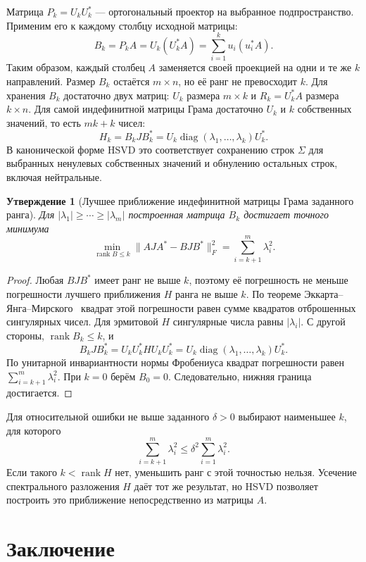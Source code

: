 \documentclass[a4paper,12pt]{article}
\DeclareMathOperator{\rank}{rank}
\DeclareMathOperator{\diag}{diag}
\theoremstyle{csstyle}
\newtheorem{proposition}[theorem]{Утверждение}
\begin{document}
Матрица $P_k=U_kU_k^*$ --- ортогональный проектор на выбранное
подпространство. Применим его к каждому столбцу исходной матрицы:
\[
B_k=P_kA=U_k(U_k^*A)=\sum_{i=1}^{k}u_i(u_i^*A).
\]
Таким образом, каждый столбец $A$ заменяется своей проекцией
на одни и те же $k$ направлений. Размер $B_k$ остаётся $m\times n$,
но её ранг не превосходит $k$.
Для хранения $B_k$ достаточно двух матриц: $U_k$ размера $m\times k$
и $R_k=U_k^*A$ размера $k\times n$.
Для самой индефинитной матрицы Грама достаточно $U_k$ и $k$ собственных значений,
то есть $mk+k$ чисел:
\[
H_k=B_kJB_k^*=U_k\diag(\lambda_1,\ldots,\lambda_k)U_k^*.
\]
В канонической форме HSVD это соответствует сохранению
строк $\Sigma$ для выбранных ненулевых собственных значений
и обнулению остальных строк, включая нейтральные.

\begin{proposition}[Лучшее приближение индефинитной матрицы Грама заданного ранга]
\label{prop:app-compression}
Для $|\lambda_1|\ge\cdots\ge|\lambda_m|$ построенная матрица $B_k$
достигает точного минимума
\[
\min_{\rank B\le k}\|AJA^*-BJB^*\|_F^2
=\sum_{i=k+1}^{m}\lambda_i^2.
\]
\end{proposition}
\begin{proof}
Любая $BJB^*$ имеет ранг не выше $k$, поэтому её погрешность не меньше
погрешности лучшего приближения $H$ ранга не выше $k$.
По теореме Эккарта--Янга--Мирского~\cite{Golub} квадрат этой погрешности
равен сумме квадратов отброшенных сингулярных чисел.
Для эрмитовой $H$ сингулярные числа равны $|\lambda_i|$.
С другой стороны, $\rank B_k\le k$, и
\[
B_kJB_k^*=U_kU_k^*HU_kU_k^*
=U_k\diag(\lambda_1,\ldots,\lambda_k)U_k^*.
\]
По унитарной инвариантности нормы Фробениуса квадрат погрешности равен
$\sum_{i=k+1}^{m}\lambda_i^2$.
При $k=0$ берём $B_0=0$. Следовательно, нижняя граница достигается.
\end{proof}

Для относительной ошибки не выше заданного $\delta>0$ выбирают
наименьшее $k$, для которого
\[
\sum_{i=k+1}^{m}\lambda_i^2\le\delta^2\sum_{i=1}^{m}\lambda_i^2.
\]
Если такого $k<\rank H$ нет, уменьшить ранг с этой точностью нельзя.
Усечение спектрального разложения $H$ даёт тот же результат, но HSVD позволяет построить это приближение непосредственно из матрицы $A$.


\section*{Заключение}
{}
\end{document}
